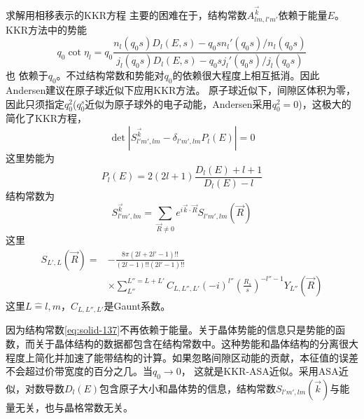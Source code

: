 求解用相移表示的KKR方程
主要的困难在于，结构常数$A_{lm,l'm'}^{\vec k}$依赖于能量$E$。KKR方法中的势能
\begin{equation}
  q_0\cot\eta_l=q_0\dfrac{n_l(q_0s)D_l(E,s)-q_0sn_l'(q_0s)/n_l(q_0s)}{j_l(q_0s)D_l(E,s)-q_0sj_l'(q_0s)/j_l(q_0s)}
  \label{eq:solid-134}
\end{equation}
也%
依赖于$q_0$。不过结构常数和势能对$q_0$的依赖很大程度上相互抵消\cite{PRB5-3894_1972,SSC11-395_1972,PRL27-1211_1971}。因此Andersen建议在原子球近似下应用KKR方法\cite{SSC13-133_1973}。
原子球近似下，间隙区体积为零，因此只须指定$q_0^2$($q_0^s$近似为原子球外的电子动能，Andersen采用$q_0^2=0$)，这极大的简化了KKR方程，
\begin{equation}
  \det|S_{l'm',lm}^{\vec k}-\delta_{l'm',lm}P_l(E)|=0
  \label{eq:solid-135}
\end{equation}
这里势能为
\begin{equation}
  P_l(E)=2(2l+1)\frac{D_l(E)+l+1}{D_l(E)-l}
  \label{eq:solid-136}
\end{equation}
结构常数为
\begin{equation}
  S_{l'm',lm}^{\vec k}=\sum_{\vec R\neq0}e^{i\vec k\cdot\vec R}S_{l'm',lm}(\vec R)
  \label{eq:solid-137}
\end{equation}
这里
\begin{equation}
  \begin{split}
    S_{L',L}(\vec R)=&-\frac{8\pi(2l+2l'-1)!!}{(2l-1)!!(2l'-1)!!}\\
    &\times\sum_{L''}^{L''=L+L'}C_{L,L'',L'}(-i)^{l''}\left(\frac{R_s}s\right)^{-l''-1}Y_{L''}(\vec R)
  \end{split}
  \label{eq:solid-138}
\end{equation}
这里$L\hat=l,m$，$C_{L,L'',L'}$是Gaunt系数。%

因为结构常数\eqref{eq:solid-137}不再依赖于能量。关于晶体势能的信息只是势能的函数，而关于晶体结构的数据都包含在结构常数中。这种势能和晶体结构的分离很大程度上简化并加速了能带结构的计算。如果忽略间隙区动能的贡献，本征值的误差不会超过价带宽度的百分之几。当$q_0$$\rightarrow$0，%
这就是KKR-ASA近似。采用ASA近似，对数导数$D_l(E)$包含原子大小和晶体势的信息，结构常数$S_{l'm',lm}(\vec k)$与能量无关，也与晶格常数无关。

